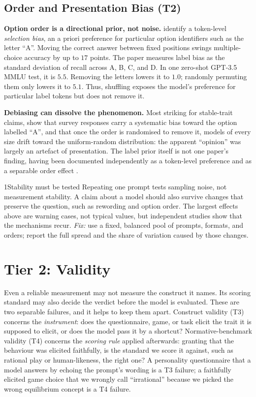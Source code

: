 \documentclass[11pt]{article}
\begin{document}
\subsection{Order and Presentation Bias (T2)}
\label{sec:t2}

\textbf{Option order is a directional prior, not noise.}
\citet{zheng2024selectors} identify a token-level \emph{selection bias}, an a
priori preference for particular option identifiers such as the letter ``A''.
Moving the correct answer between fixed positions swings multiple-choice
accuracy by up to $17$ points. The paper measures label bias as the standard
deviation of recall across A, B, C, and D. In one zero-shot GPT-3.5 MMLU test,
it is $5.5$. Removing the letters lowers it to $1.0$; randomly permuting them
only lowers it to $5.1$. Thus, shuffling exposes the model's preference for
particular label tokens but does not remove it.

\textbf{Debiasing can dissolve the phenomenon.} Most striking for stable-trait
claims, \citet{dominguez2024questioning} show that survey responses carry a
systematic bias toward the option labelled ``A'', and that once the order is
randomised to remove it, models of every size drift toward the uniform-random
distribution: the apparent ``opinion'' was largely an artefact of presentation. The label prior itself is not one paper's finding, having been
documented independently as a token-level preference and as a separable order
effect \cite{zheng2024selectors,pezeshkpour2024large,wei2024unveiling}.

\begin{takeaway}{1}{Stability must be tested}
Repeating one prompt tests sampling noise, not measurement stability. A claim
about a model should also survive changes that preserve the question, such as
rewording and option order. The largest effects above are warning cases, not
typical values, but independent studies show that the mechanisms recur.
\emph{Fix:} use a fixed, balanced pool of prompts, formats, and orders; report
the full spread and the share of variation caused by those changes.
\end{takeaway}

\section{Tier 2: Validity}
\label{sec:validity}

Even a reliable measurement may not measure the construct it names. Its scoring
standard may also decide the verdict before the model is evaluated. These are
two separable failures, and it helps to keep them apart. Construct validity
(T3) concerns the \emph{instrument}: does the questionnaire, game, or task
elicit the trait it is supposed to elicit, or does the model pass it by a
shortcut? Normative-benchmark validity (T4) concerns the \emph{scoring rule}
applied afterwards: granting that the behaviour was elicited faithfully, is
the standard we score it against, such as rational play or human-likeness,
the right one? A personality questionnaire that a model answers by echoing the
prompt's wording is a T3 failure; a faithfully elicited game choice that we
wrongly call ``irrational'' because we picked the wrong equilibrium concept is
a T4 failure.
\end{document}
